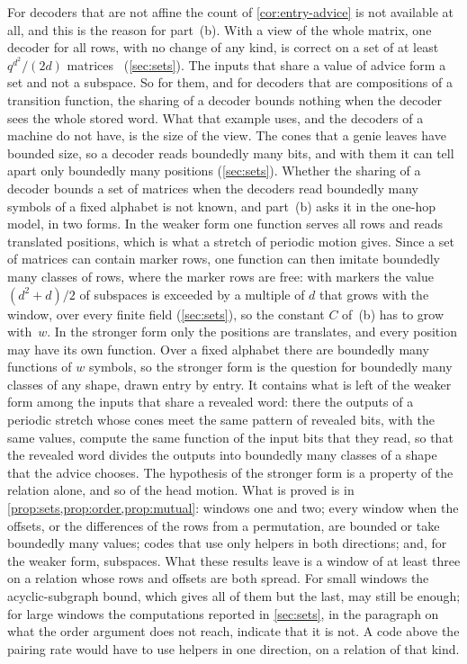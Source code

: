For decoders that are not affine the count of \cref{cor:entry-advice} is not available at all, and this is the
reason for part~(b). With a view of the whole matrix, one decoder for all rows, with no change of any kind, is correct
on a set of at least $q^{d^2}/(2d)$ matrices~\cite[Theorem~A.1 and Corollary~A.2]{SharedDecoders2026}
(\cref{sec:sets}). The inputs that share a value of advice form a set and not a subspace. So for them, and for
decoders that are compositions of a transition function, the sharing of a decoder bounds nothing when the decoder
sees the whole stored word. What that example uses, and the decoders of a machine do not have, is the size of the
view. The cones that a genie leaves have bounded size, so a decoder reads boundedly many bits, and with them it can
tell apart only boundedly many positions (\cref{sec:sets}). Whether the sharing of a decoder bounds a set of matrices
when the decoders read boundedly many symbols of a fixed alphabet is not known, and part~(b) asks it in the one-hop
model, in two forms. In the weaker form one function serves all rows and reads translated positions, which is what a
stretch of periodic motion gives. Since a set of matrices can contain marker rows, one function can then imitate
boundedly many classes of rows, where the marker rows are free: with markers the value $(d^2+d)/2$ of subspaces is
exceeded by a multiple of $d$ that grows with the window, over every finite field (\cref{sec:sets}), so the constant
$C$ of~(b) has to grow with~$w$. In the stronger form only
the positions are translates, and every position may have its own function. Over a fixed alphabet there are boundedly many functions of $w$ symbols, so the stronger form
is the question for boundedly many classes of any shape, drawn entry by entry. It contains what is left of the weaker
form among the inputs that share a revealed word: there the outputs of a periodic stretch whose cones meet the same
pattern of revealed bits, with the same values, compute the same function of the input bits that they read, so that
the revealed word divides the outputs into boundedly many classes of a shape that the advice chooses. The hypothesis
of the stronger form is a property of the relation alone, and so of the head motion. What is proved is in
\cref{prop:sets,prop:order,prop:mutual}: windows one and two; every window when the offsets, or the differences of
the rows from a permutation, are bounded or take boundedly many values; codes that use only helpers in both
directions; and, for the weaker form, subspaces. What these
results leave is a window of at least three on a relation whose rows and offsets are both spread. For small windows
the acyclic-subgraph bound, which gives all of them but the last, may still be enough; for large windows the computations
reported in \cref{sec:sets}, in the paragraph on what the order argument does not reach, indicate that it is not. A code above the pairing rate would have to use
helpers in one direction, on a relation of that kind.

